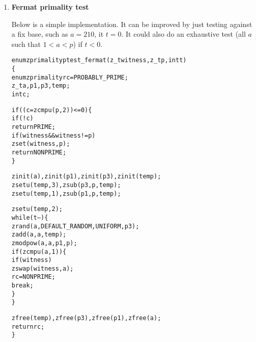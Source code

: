 \begin{enumerate}[label=\textbf{\arabic*}.]
\item \textbf{Fermat primality test}

Below is a simple implementation. It can be improved by
just testing against a fix base, such as $a = 210$, it
$t = 0$. It could also do an exhaustive test (all $a$
such that $1 < a < p$) if $t < 0$.

\vspace{-1em}
\begin{alltt}
enum zprimality ptest_fermat(z_t witness, z_t p, int t)
\{
    enum zprimality rc = PROBABLY_PRIME;
    z_t a, p1, p3, temp;
    int c;

    if ((c = zcmpu(p, 2)) <= 0) \{
        if (!c)
            return PRIME;
        if (witness && witness != p)
            zset(witness, p);
        return NONPRIME;
    \}

    zinit(a), zinit(p1), zinit(p3), zinit(temp);
    zsetu(temp, 3), zsub(p3, p, temp);
    zsetu(temp, 1), zsub(p1, p, temp);

    zsetu(temp, 2);
    while (t--) \{
        zrand(a, DEFAULT_RANDOM, UNIFORM, p3);
        zadd(a, a, temp);
        zmodpow(a, a, p1, p);
        if (zcmpu(a, 1)) \{
            if (witness)
                zswap(witness, a);
            rc = NONPRIME;
            break;
        \}
    \}

    zfree(temp), zfree(p3), zfree(p1), zfree(a);
    return rc;
\}
\end{alltt}



\end{enumerate}

